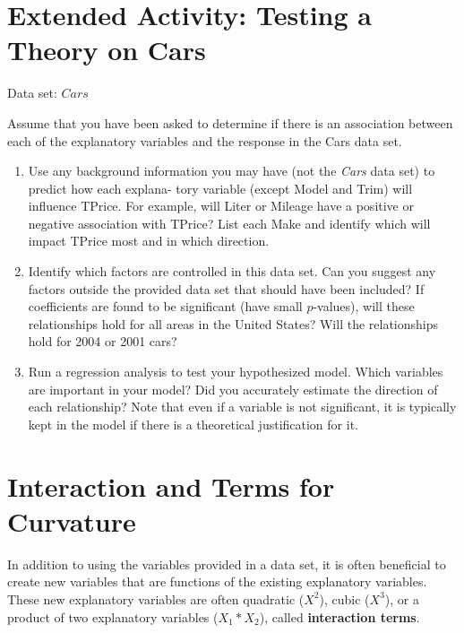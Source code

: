 \documentclass[
]{report}
\begin{document}
\hypertarget{extended-activity-testing-a-theory-on-cars}{%
\section*{Extended Activity: Testing a Theory on Cars}\label{extended-activity-testing-a-theory-on-cars}}

Data set: \(Cars\)

Assume that you have been asked to determine if there is an association between each of the explanatory variables and the response in the Cars data set.

\begin{enumerate}
\def\labelenumi{\arabic{enumi}.}
\setcounter{enumi}{31}
\item
  Use any background information you may have (not the \emph{Cars} data set) to predict how each explana-
  tory variable (except Model and Trim) will influence TPrice. For example, will Liter or Mileage have a positive or negative association with TPrice? List each Make and identify which will impact TPrice most and in which direction.
\item
  Identify which factors are controlled in this data set. Can you suggest any factors outside the provided data set that should have been included? If coefficients are found to be significant (have small \(p\)-values), will these relationships hold for all areas in the United States? Will the relationships hold for 2004 or 2001 cars?
\item
  Run a regression analysis to test your hypothesized model. Which variables are important in your model? Did you accurately estimate the direction of each relationship? Note that even if a variable is not significant, it is typically kept in the model if there is a theoretical justification
  for it.
\end{enumerate}

\hypertarget{interaction-and-terms-for-curvature}{%
\section{\texorpdfstring{\textbf{Interaction and Terms for Curvature}}{Interaction and Terms for Curvature}}\label{interaction-and-terms-for-curvature}}

In addition to using the variables provided in a data set, it is often beneficial to create new variables that are functions of the existing explanatory variables. These new explanatory variables are often quadratic (\(X^2\)), cubic (\(X^3\)), or a product of two explanatory variables (\(X_1*X_2\)), called \textbf{interaction terms}.
\end{document}
